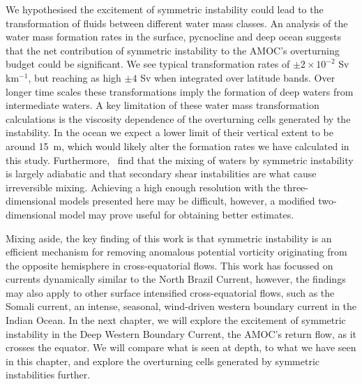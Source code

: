 We hypothesised the excitement of symmetric instability could lead to the transformation of fluids between different water mass classes. An analysis of the water mass formation rates in the surface, pycnocline and deep ocean suggests that the net contribution of symmetric instability to the AMOC's overturning budget could be significant. We see typical transformation rates of $\pm 2 \times 10^{-2}$ Sv\,km$^{-1}$, but reaching as high $\pm 4$ Sv when integrated over latitude bands. Over longer time scales these transformations imply the formation of deep waters from intermediate waters. A key limitation of these water mass transformation calculations is the viscosity dependence of the overturning cells generated by the instability. In the ocean we expect a lower limit of their vertical extent to be around 15~m, which would likely alter the formation rates we have calculated in this study. Furthermore,~\citet{Yankovsky2019} find that the mixing of waters by symmetric instability is largely adiabatic and that secondary shear instabilities are what cause irreversible mixing. Achieving a high enough resolution with the three-dimensional models presented here may be difficult, however, a modified two-dimensional model may prove useful for obtaining better estimates.

Mixing aside, the key finding of this work is that symmetric instability is an efficient mechanism for removing anomalous potential vorticity originating from the opposite hemisphere in cross-equatorial flows. This work has focussed on currents dynamically similar to the North Brazil Current, however, the findings may also apply to other surface intensified cross-equatorial flows, such as the Somali current, an intense, seasonal, wind-driven western boundary current in the Indian Ocean. In the next chapter, we will explore the excitement of symmetric instability in the Deep Western Boundary Current, the AMOC's return flow, as it crosses the equator. We will compare what is seen at depth, to what we have seen in this chapter, and explore the overturning cells generated by symmetric instabilities further.